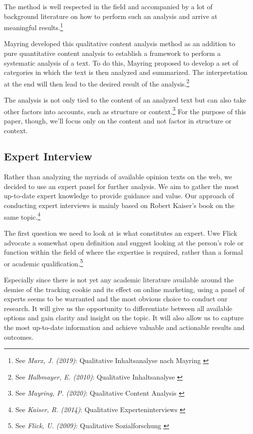 The method is well respected in the field and accompanied by a lot of background literature on how to perform such an analysis and arrive at meaningful results.\footnote{See \textit{Marx, J. (2019)}: Qualitative Inhaltsanalyse nach Mayring \cite{qualiInhalt}}

Mayring developed this qualitative content analysis method as an addition to pure quantitative content analysis to establish a framework to perform a systematic analysis of a text. To do this, Mayring proposed to develop a set of categories in which the text is then analyzed and summarized. The interpretation at the end will then lead to the desired result of the analysis.\footnote{See \textit{Halbmayer, E. (2010)}: Qualitative Inhaltsanalyse \cite{qualiVienna}}

The analysis is not only tied to the content of an analyzed text but can also take other factors into accounts, such as structure or context.\footnote{See \textit{Mayring, P. (2020)}: Qualitative Content Analysis \cite{qualiContent}} For the purpose of this paper, though, we'll focus only on the content and not factor in structure or context.

\subsection{Expert Interview}

Rather than analyzing the myriads of available opinion texts on the web, we decided to use an expert panel for further analysis. We aim to gather the most up-to-date expert knowledge to provide guidance and value. Our approach of conducting expert interviews is mainly based on Robert Kaiser's book on the same topic.\footnote{See \textit{Kaiser, R. (2014)}: Qualitative Experteninterviews \cite{expertInterviews}}

The first question we need to look at is what constitutes an expert. Uwe Flick advocate a somewhat open definition and suggest looking at the person's role or function within the field of where the expertise is required, rather than a formal or academic qualification.\footnote{See \textit{Flick, U. (2009)}: Qualitative Sozialforschung \cite{expertDefinition}}

Especially since there is not yet any academic literature available around the demise of the tracking cookie and its effect on online marketing, using a panel of experts seems to be warranted and the most obvious choice to conduct our research. It will give us the opportunity to differentiate between all available options and gain clarity and insight on the topic. It will also allow us to capture the most up-to-date information and achieve valuable and actionable results and outcomes.

